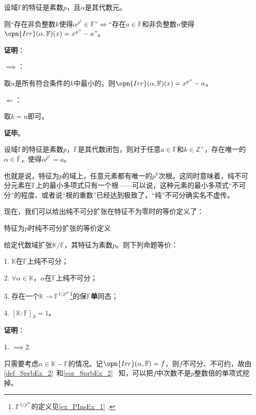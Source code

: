 \begin{lemma}{}
设域$\mathbb{F}$的特征是素数$p$，且$\alpha$是其代数元。

则“存在非负整数$k$使得$\alpha^{p^k}\in\mathbb{F}$”$\iff$“存在$a\in\mathbb{F}$和非负整数$n$使得$\opn{Irr}(\alpha, \mathbb{F})(x) = x^{p^n}-a$”。

\end{lemma}

\textbf{证明}：

$\implies$：

取$n$是所有符合条件的$k$中最小的。则$\opn{Irr}(\alpha, \mathbb{F})(x) = x^{p^n}-a$。

$\Leftarrow$：

取$k=n$即可。

\textbf{证毕}。

\begin{corollary}{}\label{cor_PInsEx_1}
设域$\mathbb{F}$的特征是素数$p$，$\overline{\mathbb{F}}$是其代数闭包，则对于任意$a\in\mathbb{F}$和$k\in\mathbb{Z}^+$，存在唯一的$\alpha\in\overline{\mathbb{F}}$，使得$\alpha^{p^k}=a$。
\end{corollary}

也就是说，特征为$p$的域上，任意元素都有唯一的$p^k$次根。这同时意味着，纯不可分元素在$\mathbb{F}$上的最小多项式只有一个根——可以说，这种元素的最小多项式“不可分”的程度、或者说“根的重数”已经达到极致了，“纯”不可分确实名不虚传。


现在，我们可以给出纯不可分扩张在特征不为零时的等价定义了：




\begin{theorem}{特征为$p$时纯不可分扩张的等价定义}\label{the_PInsEx_1}


给定代数域扩张$\mathbb{K}/\mathbb{F}$，其特征为素数$p$。则下列命题等价：

1. $\mathbb{K}$在$\mathbb{F}$上纯不可分；

2. $\forall \alpha\in\mathbb{K}$，$\alpha$在$\mathbb{F}$上纯不可分；

3. 存在一个$\mathbb{K}\to\mathbb{F}^{1/p^\infty}$\footnote{$\mathbb{F}^{1/p^\infty}$的定义见\autoref{ex_PInsEx_1} .}的保$\mathbb{F}$\textbf{单}同态；

4. $[\mathbb{K}:\mathbb{F}]_S=1$。


\end{theorem}

\textbf{证明}：

1. $\implies$2. 

只需要考虑$\alpha\in\mathbb{K}-\mathbb{F}$的情况。记$\opn{Irr}(\alpha, \mathbb{F})=f$，则$f$不可分、不可约，故由\autoref{def_SprbEx_2}~和\autoref{cor_SprbEx_2}~ 知，可以把$f$中次数不是$p$整数倍的单项式挖掉。

